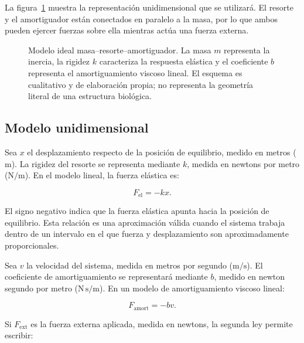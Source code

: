 La figura~\ref{fig:u2-masa-resorte-amortiguador} muestra la representación
unidimensional que se utilizará. El resorte y el amortiguador están conectados
en paralelo a la masa, por lo que ambos pueden ejercer fuerzas sobre ella
mientras actúa una fuerza externa.

\begin{figure}[htbp]
    \centering
    
    \caption{Modelo ideal masa--resorte--amortiguador. La masa \(m\) representa
    la inercia, la rigidez \(k\) caracteriza la respuesta elástica y el
    coeficiente \(b\) representa el amortiguamiento viscoso lineal. El esquema
    es cualitativo y de elaboración propia; no representa la geometría literal
    de una estructura biológica.}
    \label{fig:u2-masa-resorte-amortiguador}
\end{figure}

\subsection{Modelo unidimensional}
\label{sec:u2-msa-modelo}

Sea \(x\) el desplazamiento respecto de la posición de equilibrio, medido en metros (\(\text{m}\)). La rigidez del resorte se representa mediante \(k\), medida en newtons por metro (\(\text{N}/\text{m}\)). En el modelo lineal, la fuerza elástica es:

\begin{equation}
    F_\mathrm{el}=-kx.
    \label{eq:u2-hooke}
\end{equation}

El signo negativo indica que la fuerza elástica apunta hacia la posición de equilibrio. Esta relación es una aproximación válida cuando el sistema trabaja dentro de un intervalo en el que fuerza y desplazamiento son aproximadamente proporcionales.

Sea \(v\) la velocidad del sistema, medida en metros por segundo (\(\text{m}/\text{s}\)). El coeficiente de amortiguamiento se representará mediante \(b\), medido en newton segundo por metro (\(\text{N}\,\text{s}/\text{m}\)). En un modelo de amortiguamiento viscoso lineal:

\begin{equation}
    F_\mathrm{amort}=-bv.
    \label{eq:u2-amortiguamiento}
\end{equation}

Si \(F_\mathrm{ext}\) es la fuerza externa aplicada, medida en newtons, la segunda ley permite escribir:

